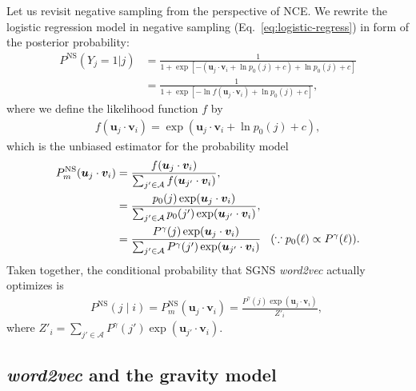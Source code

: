 \documentclass[12pt,a4paper]{article}
\newcommand{\vect}[1]{\boldsymbol{#1}}
\def\given{\mid}
\begin{document}
Let us revisit negative sampling from the perspective of NCE.
We rewrite the logistic regression model in negative sampling (Eq.~\eqref{eq:logistic-regress}) in form of the posterior probability:
\begin{align}
	P^{\text{NS}}\left(Y_{j}=1 \vert j\right) & = \frac{
		1
	}{
		1 + \exp\left[ - \left( \vect{u}_j \cdot \vect{v}_{i} + \ln p_0(j) + c \right) + \ln p_0(j) + c \right]
	}                                                    \\
	                                          & = \frac{
		1
	}{
		1 + \exp\left[ - \ln f(\vect{u}_j \cdot \vect{v}_{i}) + \ln p_0(j) + c \right]
	},
\end{align}
where we define the likelihood function $f$ by
\begin{align}
	f(\vect{u}_j \cdot \vect{v}_{i}) = \exp\left( \vect{u}_j \cdot \vect{v}_{i} + \ln p_0(j) + c\right),
\end{align}
which is the unbiased estimator for the probability model
\begin{align}
	\label{eq:unbiasef}
	P_m^{\text{NS}}(\vect{u}_j \cdot \vect{v}_{i}) & = \frac{ f(\vect{u}_j \cdot \vect{v}_{i}) }{\sum_{ j' \in {\cal A}} f(\vect{u}_{j'} \cdot \vect{v}_{i}) },                                                                                               \\
	                                               & = \frac{  p_0(j)\exp( \vect{u}_j \cdot \vect{v}_{i} ) }{\sum_{j' \in \mathcal{A}}  p_0(j') \exp(\vect{u}_{j'} \cdot \vect{v}_{i})},                                                                      \\
	                                               & = \frac{  P^\gamma(j)\exp( \vect{u}_j \cdot \vect{v}_{i} ) }{\sum_{j' \in \mathcal{A}}  P^\gamma(j') \exp(\vect{u}_{j'} \cdot \vect{v}_{i})} \hspace{0.3cm}(\because p_0(\ell) \propto P^\gamma (\ell)).
\end{align}
Taken together, the conditional probability that SGNS \textit{word2vec} actually optimizes is
\begin{align}
	P^{\text{NS}}(j\given i) = P_m^{\text{NS}}(\vect{u}_j \cdot \vect{v}_{i})  =  \frac{  P^\gamma(j)\exp( \vect{u}_j \cdot \vect{v}_{i} ) }{Z'_i},\
\end{align}
where $Z'_i=\sum_{j' \in \mathcal{A}}  P^\gamma(j') \exp(\vect{u}_{j'} \cdot \vect{v}_{i})$.

\subsection{\textit{word2vec} and the gravity model}
\end{document}
